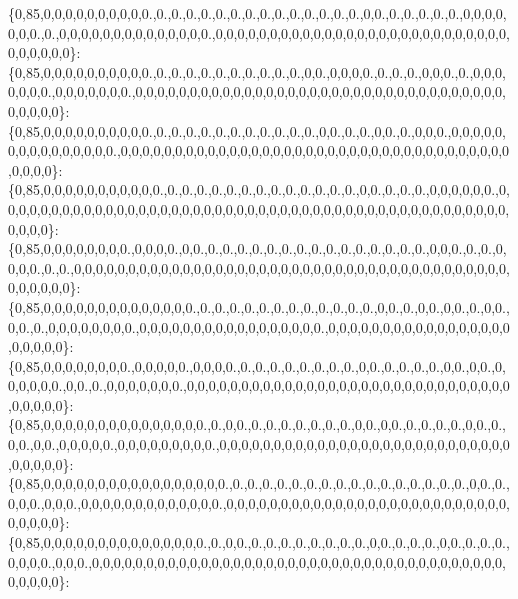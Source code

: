 \{0,85,0,0,0,0,0,0,0,0,0,0.,0.,0.,0.,0.,0.,0.,0.,0.,0.,0.,0.,0.,0.,0.,0,0.,0.,0.,0.,0.,0.,0,0,0,0,0,0,0.,0.,0,0,0,0,0,0,0,0,0,0,0,0,0,0.,0,0,0,0,0,0,0,0,0,0,0,0,0,0,0,0,0,0,0,0,0,0,0,0,0,0,0,0,0,0,0,0,0\}\+: \{0,85,0,0,0,0,0,0,0,0,0,0.,0.,0.,0.,0.,0.,0.,0.,0.,0.,0.,0,0.,0,0,0,0.,0.,0.,0.,0,0,0.,0.,0,0,0,0,0,0,0.,0,0,0,0,0,0,0.,0,0,0,0,0,0,0,0,0,0,0,0,0,0,0,0,0,0,0,0,0,0,0,0,0,0,0,0,0,0,0,0,0,0,0,0,0,0,0\}\+: \{0,85,0,0,0,0,0,0,0,0,0,0.,0.,0.,0.,0.,0.,0.,0.,0.,0.,0.,0.,0,0.,0.,0.,0,0.,0.,0,0,0.,0,0,0,0,0,0,0,0,0,0,0,0,0,0,0.,0,0,0,0,0,0,0,0,0,0,0,0,0,0,0,0,0,0,0,0,0,0,0,0,0,0,0,0,0,0,0,0,0,0,0,0,0,0,0,0\}\+: \{0,85,0,0,0,0,0,0,0,0,0,0,0.,0.,0.,0.,0.,0.,0.,0.,0.,0.,0.,0.,0.,0.,0,0.,0.,0.,0.,0,0,0,0,0,0.,0,0,0,0,0,0,0,0,0,0,0,0,0,0,0,0,0,0,0,0,0,0,0,0,0,0,0,0,0,0,0,0,0,0,0,0,0,0,0,0,0,0,0,0,0,0,0,0,0,0,0\}\+: \{0,85,0,0,0,0,0,0,0,0.,0,0,0,0.,0,0.,0.,0.,0.,0.,0.,0.,0.,0.,0.,0.,0.,0.,0.,0.,0.,0,0,0.,0.,0.,0,0,0,0.,0.,0.,0,0,0,0,0,0,0,0,0,0,0,0,0,0,0,0,0,0,0,0,0,0,0,0,0,0,0,0,0,0,0,0,0,0,0,0,0,0,0,0,0,0,0,0,0,0\}\+: \{0,85,0,0,0,0,0,0,0,0,0,0,0,0,0,0.,0.,0.,0.,0.,0.,0.,0.,0.,0.,0.,0.,0.,0,0.,0.,0,0.,0,0.,0.,0,0.,0,0.,0.,0,0,0,0,0,0,0,0.,0,0,0,0,0,0,0,0,0,0,0,0,0,0,0,0,0.,0,0,0,0,0,0,0,0,0,0,0,0,0,0,0,0,0,0,0,0,0,0\}\+: \{0,85,0,0,0,0,0,0,0,0.,0,0,0,0,0.,0,0,0,0.,0.,0.,0.,0.,0.,0.,0.,0.,0,0.,0.,0.,0.,0.,0,0.,0,0.,0,0,0,0,0,0.,0,0.,0.,0,0,0,0,0,0,0.,0,0,0,0,0,0,0,0,0,0,0,0,0,0,0,0,0,0,0,0,0,0,0,0,0,0,0,0,0,0,0,0,0,0,0\}\+: \{0,85,0,0,0,0,0,0,0,0,0,0,0,0,0,0,0.,0.,0,0.,0.,0.,0.,0.,0.,0.,0.,0,0.,0,0.,0.,0.,0.,0.,0,0.,0.,0,0.,0,0.,0,0,0,0,0.,0,0,0,0,0,0,0,0,0.,0,0,0,0,0,0,0,0,0,0,0,0,0,0,0,0,0,0,0,0,0,0,0,0,0,0,0,0,0,0,0,0\}\+: \{0,85,0,0,0,0,0,0,0,0,0,0,0,0,0,0,0,0,0.,0.,0.,0.,0.,0.,0.,0.,0.,0.,0.,0.,0.,0.,0.,0.,0.,0,0.,0.,0,0,0.,0,0,0.,0,0,0,0,0,0,0,0,0,0,0,0,0.,0,0,0,0,0,0,0,0,0,0,0,0,0,0,0,0,0,0,0,0,0,0,0,0,0,0,0,0,0,0,0\}\+: \{0,85,0,0,0,0,0,0,0,0,0,0,0,0,0,0,0.,0.,0,0.,0.,0.,0.,0.,0.,0.,0.,0.,0,0.,0.,0.,0.,0,0.,0.,0.,0.,0,0,0,0.,0,0,0.,0,0,0,0,0,0,0,0,0,0,0,0,0,0,0,0,0,0,0,0,0,0,0,0,0,0,0,0,0,0,0,0,0,0,0,0,0,0,0,0,0,0,0\}\+: 